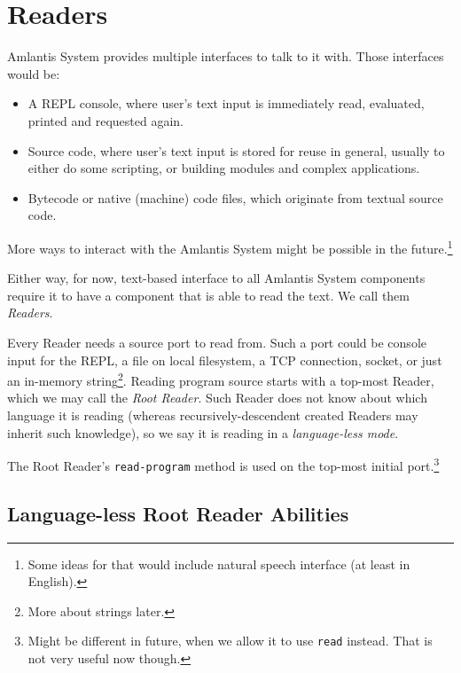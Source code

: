 
\chapter{Readers}
\label{sec:commons-readers}

Amlantis System provides multiple interfaces to talk to it with. Those interfaces would be:

\begin{itemize}
  \item A REPL console, where user's text input is immediately read, evaluated, printed and requested again.
  \item Source code, where user's text input is stored for reuse in general, usually to either do some scripting, or building modules and complex applications. 
  \item Bytecode or native (machine) code files, which originate from textual source code.
\end{itemize}

More ways to interact with the Amlantis System might be possible in the future.\footnote{Some ideas for that would include natural speech interface (at least in English).}

Either way, for now, text-based interface to all Amlantis System components require it to have a component that is able to read the text. We call them {\em Readers}.

Every Reader needs a source port to read from. Such a port could be console input for the REPL, a file on local filesystem, a TCP connection, socket, or just an in-memory string\footnote{More about strings later.}. Reading program source starts with a top-most Reader, which we may call the {\em Root Reader}. Such Reader does not know about which language it is reading (whereas recursively-descendent created Readers may inherit such knowledge), so we say it is reading in a {\em language-less mode}.

The Root Reader's \lstinline!read-program! method is used on the top-most initial port.\footnote{Might be different in future, when we allow it to use \lstinline!read! instead. That is not very useful now though.}




\newpage

\section{Language-less Root Reader Abilities}

